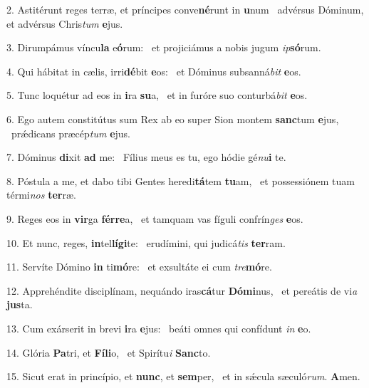 2. Astitérunt reges terræ, et príncipes conve\textbf{né}runt in \textbf{u}num \ast\  advérsus Dóminum, et advérsus Chris\textit{tum} \textbf{e}jus.\

3. Dirumpámus víncu\textbf{la} e\textbf{ó}rum: \ast\  et projiciámus a nobis jugum \textit{ip}\textbf{só}rum.\

4. Qui hábitat in cælis, irri\textbf{dé}bit \textbf{e}os: \ast\  et Dóminus subsanná\textit{bit} \textbf{e}os.\

5. Tunc loquétur ad eos in \textbf{i}ra \textbf{su}a, \ast\  et in furóre suo conturbá\textit{bit} \textbf{e}os.\

6. Ego autem constitútus sum Rex ab eo super Sion montem \textbf{sanc}tum \textbf{e}jus, \ast\  prǽdicans præcép\textit{tum} \textbf{e}jus.\

7. Dóminus \textbf{di}xit \textbf{ad} me: \ast\  Fílius meus es tu, ego hódie gé\textit{nu}\textbf{i} te.\

8. Póstula a me, et dabo tibi Gentes heredi\textbf{tá}tem \textbf{tu}am, \ast\  et possessiónem tuam térmi\textit{nos} \textbf{ter}ræ.\

9. Reges eos in \textbf{vir}ga \textbf{fér}\textbf{re}a, \ast\  et tamquam vas fíguli confrín\textit{ges} \textbf{e}os.\

10. Et nunc, reges, \textbf{in}tel\textbf{lí}\textbf{gi}te: \ast\  erudímini, qui judicá\textit{tis} \textbf{ter}ram.\

11. Servíte Dómino \textbf{in} ti\textbf{mó}re: \ast\  et exsultáte ei cum \textit{tre}\textbf{mó}re.\

12. Apprehéndite disciplínam, nequándo iras\textbf{cá}tur \textbf{Dó}\textbf{mi}nus, \ast\  et pereátis de vi\textit{a} \textbf{jus}ta.\

13. Cum exárserit in brevi \textbf{i}ra \textbf{e}jus: \ast\  beáti omnes qui confídunt \textit{in} \textbf{e}o.\

14. Glória \textbf{Pa}tri, et \textbf{Fí}\textbf{li}o, \ast\  et Spirítu\textit{i} \textbf{Sanc}to.\

15. Sicut erat in princípio, et \textbf{nunc}, et \textbf{sem}per, \ast\  et in sǽcula sæculó\textit{rum}. \textbf{A}men.\

